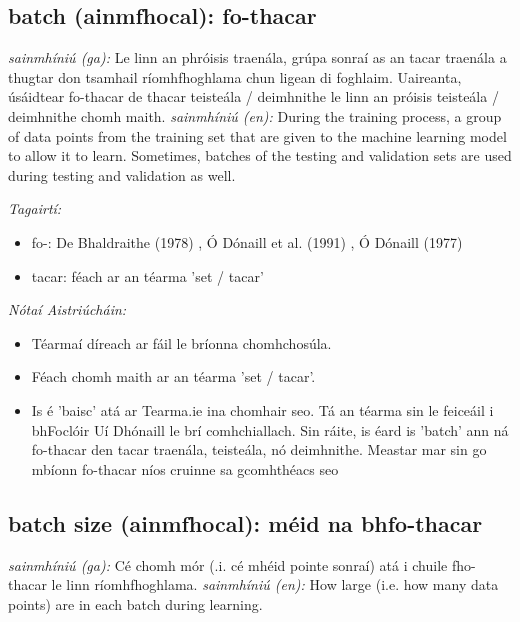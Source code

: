 \documentclass{article}
\begin{document}
\subsection*{batch (ainmfhocal): fo-thacar} 
 \noindent \textit{sainmhíniú (ga):} Le linn an phróisis traenála, grúpa sonraí as an tacar traenála a thugtar don tsamhail ríomhfhoghlama chun ligean di foghlaim. Uaireanta, úsáidtear fo-thacar de thacar teisteála / deimhnithe le linn an próisis teisteála / deimhnithe chomh maith.
\newline\newline
 \noindent \textit{sainmhíniú (en):} During the training process, a group of data points from the training set that are given to the machine learning model to allow it to learn. Sometimes, batches of the testing and validation sets are used during testing and validation as well.
\newline

 \noindent \textit{Tagairtí:}
\begin{itemize}
	\item fo-: De Bhaldraithe (1978) \cite{de-bhaldraithe}, Ó Dónaill et al. (1991) \cite{focloir-beag}, Ó Dónaill (1977) \cite{odonaill}
	\item tacar: féach ar an téarma 'set / tacar'
\end{itemize}

 \noindent \textit{Nótaí Aistriúcháin:}
\begin{itemize}
	\item Téarmaí díreach ar fáil le bríonna chomhchosúla.
	\item Féach chomh maith ar an téarma 'set / tacar'.
	\item Is é 'baisc' atá ar Tearma.ie ina chomhair seo. Tá an téarma sin le feiceáil i bhFoclóir Uí Dhónaill le brí comhchiallach. Sin ráite, is éard is 'batch' ann ná fo-thacar den tacar traenála, teisteála, nó deimhnithe. Meastar mar sin go mbíonn fo-thacar níos cruinne sa gcomhthéacs seo
\end{itemize}


\subsection*{batch size (ainmfhocal): méid na bhfo-thacar} 
 \noindent \textit{sainmhíniú (ga):} Cé chomh mór (.i. cé mhéid pointe sonraí) atá i chuile fho-thacar le linn ríomhfhoghlama.
\newline\newline
 \noindent \textit{sainmhíniú (en):} How large (i.e. how many data points) are in each batch during learning.
\newline
\end{document}
